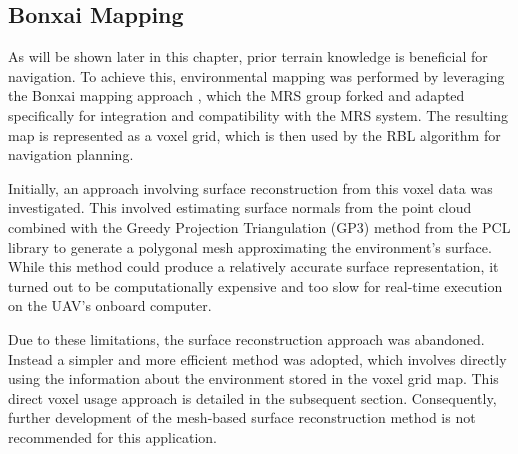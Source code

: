         \subsection{Bonxai Mapping}
            As will be shown later in this chapter, prior terrain knowledge is beneficial for navigation. 
            To achieve this, environmental mapping was performed by leveraging the Bonxai mapping approach \cite{Bonxai2025}, which the \ac{MRS} group forked and adapted specifically for integration and compatibility with the \ac{MRS} system. 
            The resulting map is represented as a voxel grid, which is then used by the \ac{RBL} algorithm for navigation planning.

            Initially, an approach involving surface reconstruction from this voxel data was investigated. 
            This involved estimating surface normals from the point cloud combined with the Greedy Projection Triangulation (GP3) method from the PCL library to generate a polygonal mesh approximating the environment's surface.
            While this method could produce a relatively accurate surface representation, it turned out to be computationally expensive and too slow for real-time execution on the \ac{UAV}'s onboard computer.

            Due to these limitations, the surface reconstruction approach was abandoned. 
            Instead a simpler and more efficient method was adopted, which involves directly using the information about the environment stored in the voxel grid map.
            This direct voxel usage approach is detailed in the subsequent section. 
            Consequently, further development of the mesh-based surface reconstruction method is not recommended for this application.

